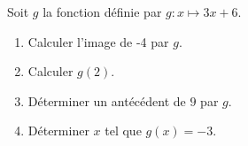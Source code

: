 \documentclass[exercice]{thedocument}%
\begin{document}
%
Soit $g$ la fonction définie par $g:x\mapsto 3x+6$.
\begin{enumerate}
    \item Calculer l'image de -4 par $g$.
    \item Calculer $g(2)$.
    \item Déterminer un antécédent de $9$ par $g$.
    \item Déterminer $x$ tel que $g(x)=-3$.
\end{enumerate}
\end{document}
